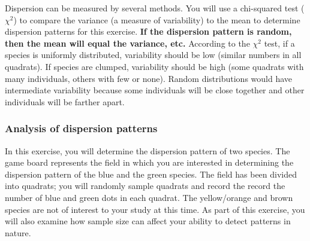 \documentclass[12pt, hidelinks]{exam}
\newcommand\chisq{$\chi^2$}
\begin{document}
Dispersion can be measured by several methods. You will use
a chi-squared test (\kern1.1667pt\chisq{}) to compare the variance
(a measure of variability) to the mean to determine dispersion patterns
for this exercise. \textbf{If the dispersion pattern is random, then the mean will equal
	the variance, etc.} According to the \chisq{} test, if a species is
uniformly distributed, variability should be low (similar numbers in all
quadrats). If species are clumped, variability should be high (some
quadrats with many individuals, others with few or none). Random
distributions would have intermediate variability because some individuals
will be close together and other individuals will be farther apart.

\subsubsection*{Analysis of dispersion patterns}

In this exercise, you will determine the dispersion pattern of two
species. The game board represents the field in which you are interested
in determining the dispersion pattern of the blue and the green species.
The field has been divided into quadrats; you will randomly sample quadrats
and record the record the number of blue and green dots in each quadrat.
The yellow/orange and brown species are not of interest to your study at
this time. As part of this exercise, you will also examine how sample
size can affect your ability to detect patterns in nature.
\end{document}
